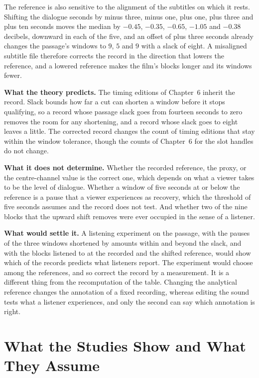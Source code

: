 \documentclass[11pt,twoside,openright]{book}
\theoremstyle{plain}
\theoremstyle{definition}
\theoremstyle{remark}
\begin{document}
The reference is also sensitive to the alignment of the subtitles on which it rests. Shifting the dialogue seconds by minus three, minus one, plus one, plus three and plus ten seconds moves the median by $-0.45$, $-0.35$, $-0.65$, $-1.05$ and $-0.38$ decibels, downward in each of the five, and an offset of plus three seconds already changes the passage's windows to $9$, $5$ and $9$ with a slack of eight. A misaligned subtitle file therefore corrects the record in the direction that lowers the reference, and a lowered reference makes the film's blocks longer and its windows fewer.

\textbf{What the theory predicts.} The timing editions of Chapter~6 inherit the record. Slack bounds how far a cut can shorten a window before it stops qualifying, so a record whose passage slack goes from fourteen seconds to zero removes the room for any shortening, and a record whose slack goes to eight leaves a little. The corrected record changes the count of timing editions that stay within the window tolerance, though the counts of Chapter~6 for the slot handles do not change.

\textbf{What it does not determine.} Whether the recorded reference, the proxy, or the centre-channel value is the correct one, which depends on what a viewer takes to be the level of dialogue. Whether a window of five seconds at or below the reference is a pause that a viewer experiences as recovery, which the threshold of five seconds assumes and the record does not test. And whether two of the nine blocks that the upward shift removes were ever occupied in the sense of a listener.

\textbf{What would settle it.} A listening experiment on the passage, with the pauses of the three windows shortened by amounts within and beyond the slack, and with the blocks listened to at the recorded and the shifted reference, would show which of the records predicts what listeners report. The experiment would choose among the references, and so correct the record by a measurement. It is a different thing from the recomputation of the table. Changing the analytical reference changes the annotation of a fixed recording, whereas editing the sound tests what a listener experiences, and only the second can say which annotation is right.

\section{What the Studies Show and What They Assume}\label{sec:limits17}
\end{document}
